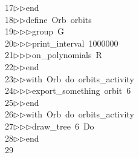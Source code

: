 \begin{tabbing}
17\>$\triangleright$\>$\triangleright$\>end\ \\[0pt]
18\>$\triangleright$\>$\triangleright$\>define\ Orb\ orbits\ \\[0pt]
19\>$\triangleright$\>$\triangleright$\>$\triangleright$\>group\ G\ \\[0pt]
20\>$\triangleright$\>$\triangleright$\>$\triangleright$\>print\_interval\ 1000000\ \\[0pt]
21\>$\triangleright$\>$\triangleright$\>$\triangleright$\>on\_polynomials\ R\ \\[0pt]
22\>$\triangleright$\>$\triangleright$\>end\ \\[0pt]
23\>$\triangleright$\>$\triangleright$\>with\ Orb\ do\ orbits\_activity\ \\[0pt]
24\>$\triangleright$\>$\triangleright$\>$\triangleright$\>export\_something\ orbit\ 6\ \\[0pt]
25\>$\triangleright$\>$\triangleright$\>end\\[0pt]
26\>$\triangleright$\>$\triangleright$\>with\ Orb\ do\ orbits\_activity\ \\[0pt]
27\>$\triangleright$\>$\triangleright$\>$\triangleright$\>draw\_tree\ 6\ Do\ \\[0pt]
28\>$\triangleright$\>$\triangleright$\>end\\[0pt]
29\>\end{tabbing}
